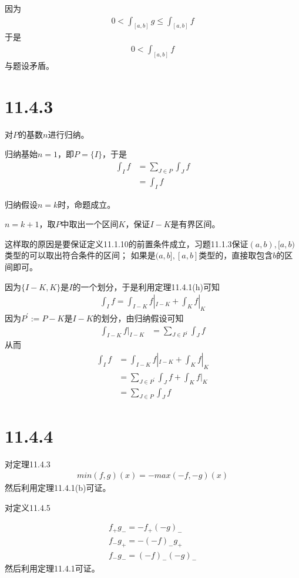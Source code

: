 \documentclass{article}
\begin{document}
因为
\begin{align*}
  0 < \int_{[a, b]} g \leq \int_{[a, b]} f
\end{align*}
于是
\begin{align*}
  0 < \int_{[a, b]} f
\end{align*}
与题设矛盾。

\section*{11.4.3}
对$P$的基数$n$进行归纳。

归纳基始$n = 1$，即$P = \{I\}$，于是
\begin{align*}
  \int_I f & = \sum\limits_{J \in P} \int_J f \\
           & = \int_I f
\end{align*}

归纳假设$n = k$时，命题成立。

$n = k+1$，取$P$中取出一个区间$K$，保证$I - K$是有界区间。

\begin{zremark}
  这样取的原因是要保证定义11.1.10的前置条件成立，习题11.1.3保证$(a,b),[a,b)$类型的可以取出符合条件的区间；
  如果是$(a, b], [a, b]$类型的，直接取包含$b$的区间即可。
\end{zremark}

因为$\{I - K, K\}$是$I$的一个划分，于是利用定理11.4.1(h)可知
\begin{align*}
  \int_I f = \int_{I - K} f|_{I - K} + \int_K f|_K
\end{align*}
因为$P^\prime :=P - K$是$I - K$的划分，由归纳假设可知
\begin{align*}
  \int_{I - K} f|_{I - K} & = \sum\limits_{J \in P^\prime} \int_J f
\end{align*}
从而
\begin{align*}
  \int_I f & = \int_{I - K} f|_{I - K} + \int_K f|_K \\
           & = \sum\limits_{J \in P^\prime} \int_J f + \int_K f|_K \\
           & = \sum\limits_{J \in P} \int_J f
\end{align*}

\section*{11.4.4}

对定理11.4.3
\begin{align*}
  min(f, g)(x) = -max(-f, -g)(x)
\end{align*}
然后利用定理11.4.1(b)可证。

对定义11.4.5

\begin{align*}
  f_{+}g_{-} = -f_{+}(-g)_{-} \\
  f_{-}g_{+} = -(-f)_{-}g_{+} \\
  f_{-}g_{-} = (-f)_{-}(-g)_{-}
\end{align*}
然后利用定理11.4.1可证。
\end{document}
